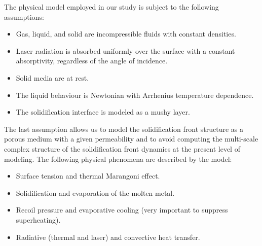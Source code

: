 \documentclass{article}
\begin{document}
The physical model employed in our study is subject to the following assumptions:
\begin{itemize}
    \item Gas, liquid, and solid are incompressible fluids with constant densities.
    \item Laser radiation is absorbed uniformly over the surface with a constant absorptivity, regardless of the angle of incidence.
    \item Solid media are at rest.
    \item The liquid behaviour is Newtonian with Arrhenius temperature dependence.
    \item The solidification interface is modeled as a mushy layer.
\end{itemize}
The last assumption allows us to model the solidification front structure as a porous medium
with a given permeability and to avoid computing the multi-scale complex structure
of the solidification front dynamics at the present level of modeling.
The following physical phenomena are described by the model:
\begin{itemize}
    \item Surface tension and thermal Marangoni effect.
    \item Solidification and evaporation of the molten metal.
    \item Recoil pressure and evaporative cooling (very important to suppress superheating).
    \item Radiative (thermal and laser) and convective heat transfer.
\end{itemize}
\end{document}
